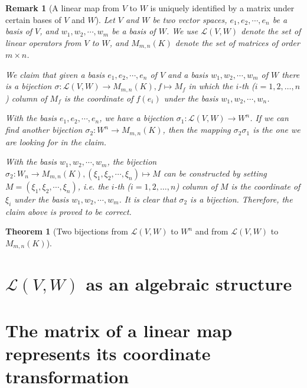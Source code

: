 \documentclass[onecolumn]{ctexart}
\newtheorem{theorem}{Theorem}
\newtheorem{remark}{Remark}
\begin{document}
\begin{remark}[A linear map from $V$ to $W$ is uniquely identified by a matrix under certain bases of $V$ and $W$]
  Let $V$ and $W$ be two vector spaces, $e_1, e_2, \cdots, e_n$ be a basis of $V$, 
  and $w_1, w_2, \cdots, w_m$ be a basis of $W$. We use $\mathcal{L}(V, W)$ denote 
  the set of linear operators from $V$ to $W$, and $M_{m, n}(K)$ denote the set 
  of matrices of order $m \times n$.

  We claim that given a basis $e_1, e_2, \cdots, e_n$ of $V$ and a basis $w_1, 
  w_2, \cdots, w_m$ of $W$ there is a bijection $\sigma: \mathcal{L}(V, W) \to 
  M_{m, n}(K), f \mapsto M_f$ in which the $i$-th ($i = 1, 2, \ldots, n$) column 
  of $M_f$ is the coordinate of $f(e_i)$ under the basis $w_1, w_2, \cdots, w_n$.

  With the basis $e_1, e_2, \cdots, e_n$, we have a bijection $\sigma_1: \mathcal{L}(V, W) \to W^n$. If we can find another bijection $\sigma_2: W^n \to M_{m, n}(K)$, then the mapping $\sigma_2 \sigma_1$ is the one we are looking for in the claim.

  With the basis $w_1, w_2, \cdots, w_m$, the bijection $\sigma_2: W_n \to 
  M_{m, n}(K), (\xi_1, \xi_2, \cdots, \xi_n) \mapsto M$ can be constructed by 
  setting $M = (\xi_1, \xi_2, \cdots, \xi_n)$, i.e. the $i$-th ($i = 1,2,\ldots,
  n$) column of $M$ is the coordinate of $\xi_i$ under the basis $w_1, w_2, \cdots, 
  w_m$. It is clear that $\sigma_2$ is a bijection. Therefore, the claim above 
  is proved to be correct.
\end{remark}

\begin{theorem}[Two bijections from $\mathcal{L}(V, W)$ to $W^n$ and from $\mathcal{L}(V, W)$ to $M_{m, n}(K)$]
  
\end{theorem}

\section{$\mathcal{L}(V, W)$ as an algebraic structure}

\section{The matrix of a linear map represents its coordinate transformation}
\end{document}
